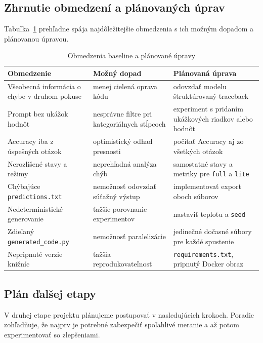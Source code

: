 \subsection{Zhrnutie obmedzení a plánovaných úprav}

Tabuľka~\ref{tab:limits} prehľadne spája najdôležitejšie obmedzenia s ich možným dopadom a plánovanou úpravou.

\begin{table}[h]
\centering
\small
\caption{Obmedzenia baseline a plánované úpravy}
\label{tab:limits}
\renewcommand{\arraystretch}{1.25}
\begin{tabular}{@{}>{\raggedright\arraybackslash}p{4.2cm} >{\raggedright\arraybackslash}p{4.6cm} >{\raggedright\arraybackslash}p{4.6cm}@{}}
\toprule
\textbf{Obmedzenie} & \textbf{Možný dopad} & \textbf{Plánovaná úprava} \\
\midrule
Všeobecná informácia o chybe v druhom pokuse & menej cielená oprava kódu & odovzdať modelu štruktúrovaný traceback \\
Prompt bez ukážok hodnôt & nesprávne filtre pri kategoriálnych stĺpcoch & experiment s pridaním ukážkových riadkov alebo hodnôt \\
Accuracy iba z úspešných otázok & optimistický odhad presnosti & počítať Accuracy aj zo všetkých otázok \\
Nerozlíšené stavy a režimy & neprehľadná analýza chýb & samostatné stavy a metriky pre \texttt{full} a \texttt{lite} \\
Chýbajúce \texttt{predictions.txt} & nemožnosť odovzdať súťažný výstup & implementovať export oboch súborov \\
Nedeterministické generovanie & ťažšie porovnanie experimentov & nastaviť teplotu a \texttt{seed} \\
Zdieľaný \texttt{generated\_code.py} & nemožnosť paralelizácie & jedinečné dočasné súbory pre každé spustenie \\
Nepripnuté verzie knižníc & ťažšia reprodukovateľnosť & \texttt{requirements.txt}, pripnutý Docker obraz \\
\bottomrule
\end{tabular}
\end{table}

\subsection{Plán ďalšej etapy}

V druhej etape projektu plánujeme postupovať v nasledujúcich krokoch. Poradie zohľadňuje, že najprv je potrebné zabezpečiť spoľahlivé meranie a až potom experimentovať so zlepšeniami.

